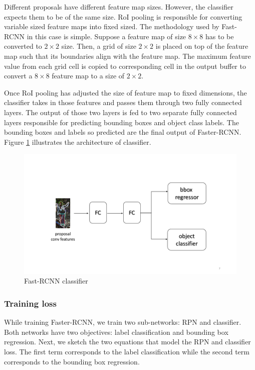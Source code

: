 Different proposals have different feature map sizes. However, the classifier expects them to be of the same size. RoI pooling is responsible for converting variable sized feature maps into fixed sized. The methodology used by Fast-RCNN in this case is simple. Suppose a feature map of size $8\times 8$ has to be converted to $2 \times 2$ size. Then, a grid of size $2 \times 2$ is placed on top of the feature map such that its boundaries align with the feature map. The maximum feature value from each grid cell is copied to corresponding cell in the output buffer to convert a $8\times 8$ feature map to a size of $2 \times 2$.

Once RoI pooling has adjusted the size of feature map to fixed dimensions, the classifier takes in those features and passes them through two fully connected layers. The output of those two layers is fed to two separate fully connected layers responsible for predicting bounding boxes and object class labels. The bounding boxes and labels so predicted are the final output of Faster-RCNN. Figure \ref{fig:classifier} illustrates the architecture of classifier.

\begin{figure}
    \centering
    \includegraphics[width=\linewidth,trim={0 90 0 120},clip]{images/classifier}
    \caption{Fast-RCNN classifier}
    \label{fig:classifier}
\end{figure}

\subsubsection{Training loss}
While training Faster-RCNN, we train two sub-networks: RPN and classifier. Both networks have two objectives: label classification and bounding box regression. Next, we sketch the two equations that model the RPN and classifier loss. The first term corresponds to the label classification while the second term corresponds to the bounding box regression. 

